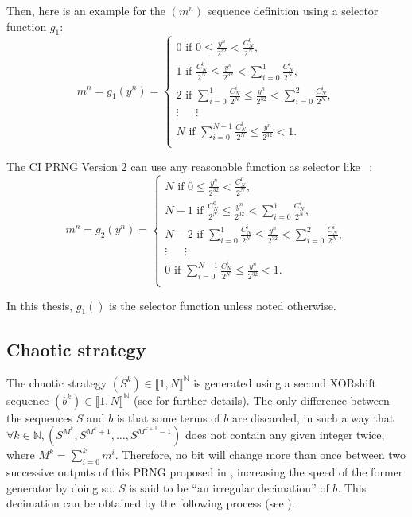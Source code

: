 Then, here is an example for the $(m^n)$ sequence definition using a selector function $g_1$:
\begin{equation}
\label{v2_g1}
m^n = g_1(y^n)=
\left\{
\begin{array}{l}
0 \text{ if }0 \leqslant\frac{y^n}{2^{32}}<\frac{C^0_N}{2^N},\\
1 \text{ if }\frac{C^0_N}{2^N} \leqslant\frac{y^n}{2^{32}}<\sum_{i=0}^1\frac{C^i_N}{2^N},\\
2 \text{ if }\sum_{i=0}^1\frac{C^i_N}{2^N} \leqslant\frac{y^n}{2^{32}}<\sum_{i=0}^2\frac{C^i_N}{2^N},\\
\vdots~~~~~ ~~\vdots~~~ ~~~~\\
N \text{ if }\sum_{i=0}^{N-1}\frac{C^i_N}{2^N} \leqslant\frac{y^n}{2^{32}}<1.\\
\end{array}
\right.
\end{equation}

The CI PRNG Version 2 can use any reasonable function as selector like ~\cite{bibtexwangqianxue}:
\begin{equation}
\label{v2_g2}
m^n = g_2(y^n)=
\left\{
\begin{array}{l}
N \text{ if }0 \leqslant\frac{y^n}{2^{32}}<\frac{C^0_N}{2^N},\\
N-1 \text{ if }\frac{C^0_N}{2^N} \leqslant\frac{y^n}{2^{32}}<\sum_{i=0}^1\frac{C^i_N}{2^N},\\
N-2 \text{ if }\sum_{i=0}^1\frac{C^i_N}{2^N} \leqslant\frac{y^n}{2^{32}}<\sum_{i=0}^2\frac{C^i_N}{2^N},\\
\vdots~~~~~ ~~\vdots~~~ ~~~~\\
0 \text{ if }\sum_{i=0}^{N-1}\frac{C^i_N}{2^N} \leqslant\frac{y^n}{2^{32}}<1.\\
\end{array}
\right.
\end{equation}

In this thesis, $g_1()$ is the selector function unless noted otherwise. 


\subsection{Chaotic strategy}
\label{Chaotic strategy}
The chaotic strategy $(S^k) \in \llbracket 1, N \rrbracket^\mathds{N}$ is generated using a second XORshift sequence $(b^k) \in \llbracket 1, N \rrbracket^\mathds{N}$ (see \cite{Bahi2000} for further details). The only difference between the sequences $S$ and $b$ is that some terms of $b$ are discarded, in such a way that $\forall k \in \mathds{N}, (S^{M^k}, S^{M^k+1}, \hdots, S^{M^{k+1}-1})$ does not contain any given integer twice, where $M^k = \sum_{i=0}^k m^i$. Therefore, no bit will change more than once between two successive outputs of this PRNG proposed in \cite{wbg10:ip}, increasing the speed of the former generator by doing so. $S$ is said to be ``an irregular decimation'' of $b$. This decimation can be obtained by the following process (see \cite{wbg10:ip}).


